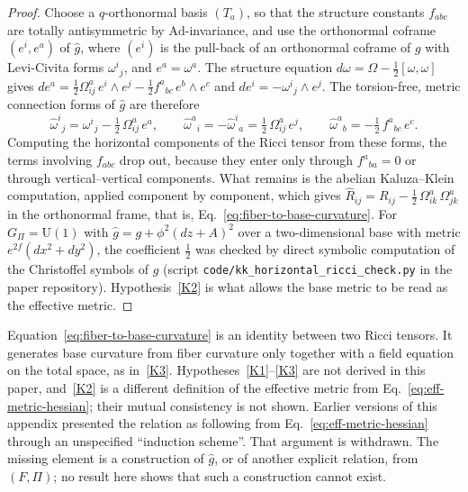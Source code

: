     \begin{proof}
      Choose a $q$-orthonormal basis $(T_a)$, so that the structure constants $f_{abc}$ are totally antisymmetric
      by $\mathrm{Ad}$-invariance, and use the orthonormal coframe $(e^i, e^a)$ of $\hat g$,
      where $(e^i)$ is the pull-back of an orthonormal coframe of $g$ with Levi-Civita forms $\omega^i{}_j$,
      and $e^a = \omega^a$.
      The structure equation $d\omega = \Omega - \tfrac12[\omega,\omega]$ gives
      $de^a = \tfrac12\Omega^a_{ij}\,e^i\wedge e^j - \tfrac12 f^a{}_{bc}\,e^b\wedge e^c$
      and $de^i = -\omega^i{}_j\wedge e^j$.
      The torsion-free, metric connection forms of $\hat g$ are therefore
      \begin{equation*}
        \hat\omega^i{}_j = \omega^i{}_j - \tfrac12\,\Omega^a_{ij}\,e^a,
        \qquad
        \hat\omega^a{}_i = -\hat\omega^i{}_a = \tfrac12\,\Omega^a_{ij}\,e^j,
        \qquad
        \hat\omega^a{}_b = -\tfrac12\, f^a{}_{bc}\,e^c .
      \end{equation*}
      Computing the horizontal components of the Ricci tensor from these forms, the terms involving $f_{abc}$ drop out,
      because they enter only through $f^a{}_{ba} = 0$ or through vertical--vertical components.
      What remains is the abelian Kaluza--Klein computation, applied component by component, which gives
      $\widehat{R}_{ij} = R_{ij} - \tfrac12\,\Omega^a_{ik}\,\Omega^a_{jk}$ in the orthonormal frame, that is,
      Eq.~\eqref{eq:fiber-to-base-curvature}.
      For $G_\Pi = \mathrm{U}(1)$ with $\hat g = g + \phi^2(dz + A)^2$ over a two-dimensional base with metric
      $e^{2f}(dx^2 + dy^2)$, the coefficient $\tfrac12$ was checked by direct symbolic computation of the Christoffel
      symbols of $\hat g$ (script \texttt{code/kk\_horizontal\_ricci\_check.py} in the paper repository).
      Hypothesis~\ref{K2} is what allows the base metric to be read as the effective metric.
    \end{proof}

    \begin{remark}[Status]
      Equation~\eqref{eq:fiber-to-base-curvature} is an identity between two Ricci tensors.
      It generates base curvature from fiber curvature only together with a field equation on the total space,
      as in~\ref{K3}.
      Hypotheses~\ref{K1}--\ref{K3} are not derived in this paper, and~\ref{K2} is a different definition of the
      effective metric from Eq.~\eqref{eq:eff-metric-hessian}; their mutual consistency is not shown.
      Earlier versions of this appendix presented the relation as following from Eq.~\eqref{eq:eff-metric-hessian}
      through an unspecified ``induction scheme''.
      That argument is withdrawn.
      The missing element is a construction of $\hat g$, or of another explicit relation, from $(F, \Pi)$; no result
      here shows that such a construction cannot exist.
    \end{remark}

